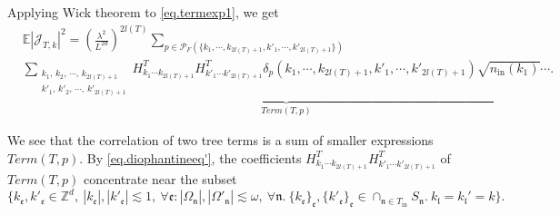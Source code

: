  Applying Wick theorem to \eqref{eq.termexp1}, we get
 \begin{equation}\label{eq.termexp'}
 \begin{split}
  &\mathbb{E}|\mathcal{J}_{T,k}|^2=\left(\frac{\lambda^2}{L^{2d}}\right)^{2l(T)}
  \sum_{p\in \mathcal{P}_F(\{k_1,\cdots, k_{2l(T)+1}, k'_1,\cdots, k'_{2l(T)+1}\})}
  \\[0.5em]
  & \underbrace{\sum_{\substack{k_1,\, k_2,\, \cdots,\, k_{2l(T)+1}\\k'_1,\, k'_2,\, \cdots,\, k'_{2l(T)+1}}}
  H^T_{k_1\cdots k_{2l(T)+1}} H^{T}_{k'_1\cdots k'_{2l(T)+1}} \delta_{p}(k_1,\cdots, k_{2l(T)+1}, k'_1,\cdots, k'_{2l(T)+1})\sqrt{n_{\textrm{in}}(k_1)}\cdots}_{Term(T, p)}.
 \end{split}
 \end{equation}
 
 We see that the correlation of two tree terms is a sum of smaller expressions $Term(T, p)$. By \eqref{eq.diophantineeq'}, the coefficients $H^T_{k_1\cdots k_{2l(T)+1}} H^{T}_{k'_1\cdots k'_{2l(T)+1}}$ of $Term(T, p)$ concentrate near the subset 
 \begin{equation}\label{eq.diophantineequnpaired}
  \{k_{\mathfrak{e}}, k'_{\mathfrak{e}}\in \mathbb{Z}^d,\ |k_{\mathfrak{e}}|, |k'_{\mathfrak{e}}|\lesssim 1,\ \forall \mathfrak{e}: |\Omega_{\mathfrak{n}}|,|\Omega'_{\mathfrak{n}}|\lesssim \omega,\ \forall \mathfrak{n}. \ \{k_{\mathfrak{e}}\}_{\mathfrak{e}}, \{k'_{\mathfrak{e}}\}_{\mathfrak{e}}\in \cap_{\mathfrak{n}\in T_{\text{in}}} S_{\mathfrak{n}}.\ k_{\mathfrak{l}}=k_{\mathfrak{l}}'=k\}.
 \end{equation}
 
